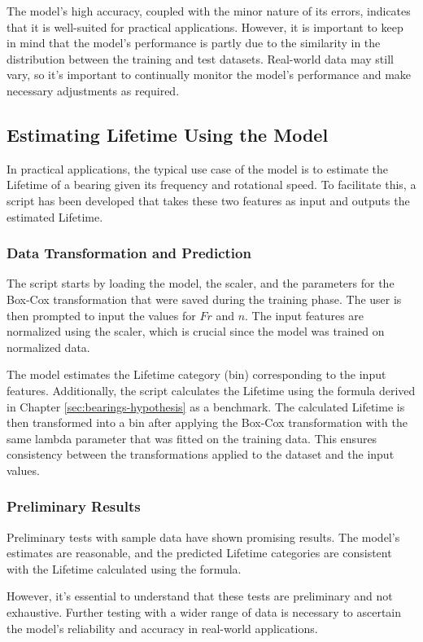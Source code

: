 The model's high accuracy, coupled with the minor nature of its errors, indicates that it is well-suited for practical applications. However, it is important to keep in mind that the model's performance is partly due to the similarity in the distribution between the training and test datasets. Real-world data may still vary, so it's important to continually monitor the model's performance and make necessary adjustments as required.


\subsection{Estimating Lifetime Using the Model}
In practical applications, the typical use case of the model is to estimate the Lifetime of a bearing given its frequency and rotational speed. To facilitate this, a script has been developed that takes these two features as input and outputs the estimated Lifetime.

\subsubsection{Data Transformation and Prediction}
The script starts by loading the model, the scaler, and the parameters for the Box-Cox transformation that were saved during the training phase. The user is then prompted to input the values for \(Fr\) and \(n\). The input features are normalized using the scaler, which is crucial since the model was trained on normalized data.

The model estimates the Lifetime category (bin) corresponding to the input features. Additionally, the script calculates the Lifetime using the formula derived in Chapter \ref{sec:bearings-hypothesis} as a benchmark. The calculated Lifetime is then transformed into a bin after applying the Box-Cox transformation with the same lambda parameter that was fitted on the training data. This ensures consistency between the transformations applied to the dataset and the input values.

\subsubsection{Preliminary Results}
Preliminary tests with sample data have shown promising results. The model's estimates are reasonable, and the predicted Lifetime categories are consistent with the Lifetime calculated using the formula.

However, it's essential to understand that these tests are preliminary and not exhaustive. Further testing with a wider range of data is necessary to ascertain the model's reliability and accuracy in real-world applications.

